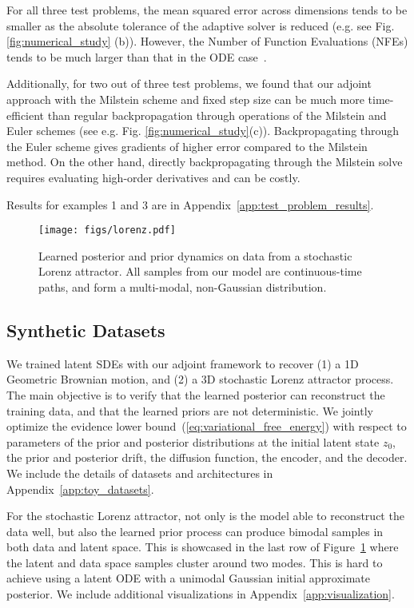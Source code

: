 \documentclass[twoside]{article}
\begin{document}
For all three test problems, the mean squared error across dimensions tends to be smaller as the absolute tolerance of the adaptive solver is reduced (e.g. see Fig. \ref{fig:numerical_study} (b)). 
However, the Number of Function Evaluations (NFEs) tends to be much larger than that in the ODE case~\cite{chen2018neural}.

Additionally, for two out of three test problems, we found that our adjoint approach with the Milstein scheme and fixed step size can be much more time-efficient than regular backpropagation through operations of the Milstein and Euler schemes (see e.g. Fig. \ref{fig:numerical_study}(c)).
Backpropagating through the Euler scheme gives gradients of higher error compared to the Milstein method. 
On the other hand, directly backpropagating through the Milstein solve requires evaluating high-order derivatives and can be costly.

Results for examples 1 and 3 are in Appendix~\ref{app:test_problem_results}.
\begin{figure}[ht]
\begin{minipage}[ht]{\linewidth}
\centering
{\texttt{[image: figs/lorenz.pdf]}}
\end{minipage}
\caption{
Learned posterior and prior dynamics on data from a stochastic Lorenz attractor.
All samples from our model are continuous-time paths, and form a multi-modal, non-Gaussian distribution.
}
\label{fig:toy_experiments_lorenz}
\end{figure}

\subsection{Synthetic Datasets}
We trained latent SDEs with our adjoint framework to recover (1) a 1D Geometric Brownian motion, and (2) a 3D stochastic Lorenz attractor process. 
The main objective is to verify that the learned posterior can reconstruct the training data, and that the learned priors are not deterministic. 
We jointly optimize the evidence lower bound~(\ref{eq:variational_free_energy}) with respect to parameters of the prior and posterior distributions at the initial latent state $z_0$, the prior and posterior drift, the diffusion function, the encoder, and the decoder.
We include the details of datasets and architectures in Appendix~\ref{app:toy_datasets}.

For the stochastic Lorenz attractor, not only is the model able to reconstruct the data well, but also the learned prior process can produce bimodal samples in both data and latent space. 
This is showcased in the last row of Figure~\ref{fig:toy_experiments_lorenz} where the latent and data space samples cluster around two modes.
This is hard to achieve using a latent ODE with a unimodal Gaussian initial approximate posterior.
We include additional visualizations in Appendix~\ref{app:visualization}.
\end{document}
